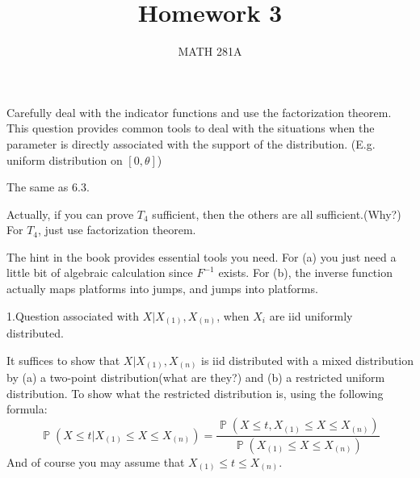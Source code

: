 \documentclass[12pt]{article}
\newenvironment{exercise}[2][Exercise]{\begin{trivlist}
\item[\hskip \labelsep {\bfseries #1}\hskip \labelsep {\bfseries #2.}]}{\end{trivlist}}
\renewcommand{\P}{\operatorname{\mathbb{P}}}
\begin{document}
\title{Homework 3}%
\author{MATH 281A} %
\maketitle
\begin{exercise}{6.3}
\end{exercise}

Carefully deal with the indicator functions and use the factorization theorem. This question provides common tools to deal with the situations when the parameter is directly associated with the support of the distribution. (E.g. uniform distribution on $[0,\theta]$)

\begin{exercise}{6.4}
\end{exercise}

The same as 6.3.

\begin{exercise}{6.5}
\end{exercise}

Actually, if you can prove $T_4$ sufficient, then the others are all sufficient.(Why?) For $T_4$, just use factorization theorem.

\begin{exercise}{7.10}
\end{exercise}

The hint in the book provides essential tools you need. For (a) you just need a little bit of algebraic calculation since $F^{-1}$ exists. For (b), the inverse function actually maps platforms into jumps, and jumps into platforms.

\begin{exercise}{Extra}
\end{exercise}

1.Question associated with $X | X_{(1)} , X_{(n)}$, when $X_i$ are iid uniformly distributed. 

It suffices to show that $X | X_{(1)} , X_{(n)}$ is iid distributed with a mixed distribution by (a) a two-point distribution(what are they?) and (b) a restricted uniform distribution. To show what the restricted distribution is, using the following formula:
$$
\P(X\leq t | X_{(1)} \leq X \leq X_{(n)}) = \frac{\P(X\leq t , X_{(1)} \leq X \leq X_{(n)})}{\P(X_{(1)} \leq X \leq X_{(n)})}
$$
And of course you may assume that $ X_{(1)} \leq t \leq X_{(n)} $.
\end{document}
